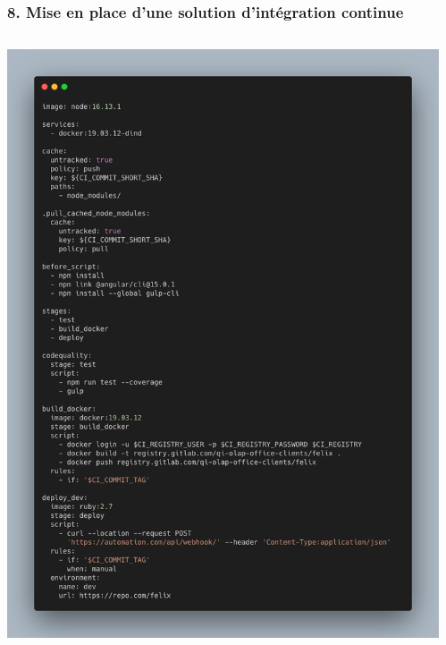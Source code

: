 \documentclass[aspectratio=169]{beamer}
\begin{document}
\begin{frame}
  \frametitle{8. Mise en place d’une solution d’intégration continue}
  \begin{columns}
    \begin{column}{0.5\textwidth}
      \includegraphics[height=0.75\textheight, center]{Imgs/CICD-Felix.png}
    \end{column}
    \begin{column}{0.5\textwidth}

\end{column}
\end{columns}
\end{frame}
\end{document}
